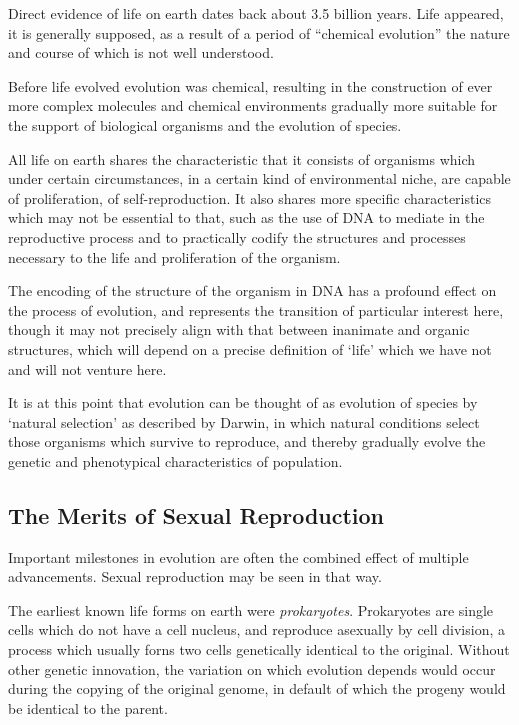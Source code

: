 \documentclass[10pt,titlepage]{book}
\begin{document}
Direct evidence of life on earth dates back about 3.5 billion years.
Life appeared, it is generally supposed, as a result of a period of ``chemical evolution'' the nature and course of which is not well understood.



Before life evolved evolution was chemical, resulting in the construction of ever more complex molecules and chemical environments gradually more suitable for the support of biological organisms and the evolution of species.

All life on earth shares the characteristic that it consists of organisms which under certain circumstances, in a certain kind of environmental niche, are capable of proliferation, of self-reproduction.
It also shares more specific characteristics which may not be essential to that, such as the use of DNA to mediate in the reproductive process and to practically codify the structures and processes necessary to the life and proliferation of the organism.

The encoding of the structure of the organism in DNA has a profound effect on the process of evolution, and represents the transition of particular interest here, though it may not precisely align with that between inanimate and organic structures, which will depend on a precise definition of `life' which we have not and will not venture here.

It is at this point that evolution can be thought of as evolution of species by `natural selection' as described by Darwin, in which natural conditions select those organisms which survive to reproduce, and thereby gradually evolve the genetic and phenotypical characteristics of population.

\subsection{The Merits of Sexual Reproduction}

Important milestones in evolution are often the combined effect of multiple advancements.
Sexual reproduction may be seen in that way.

The earliest known life forms on earth were \emph{prokaryotes}.
Prokaryotes are single cells which do not have a cell nucleus, and reproduce asexually by cell division, a process which usually forns two cells genetically identical to the original.
Without other genetic innovation, the variation on which evolution depends would occur during the copying of the original genome, in default of which the progeny would be identical to the parent.
\end{document}

